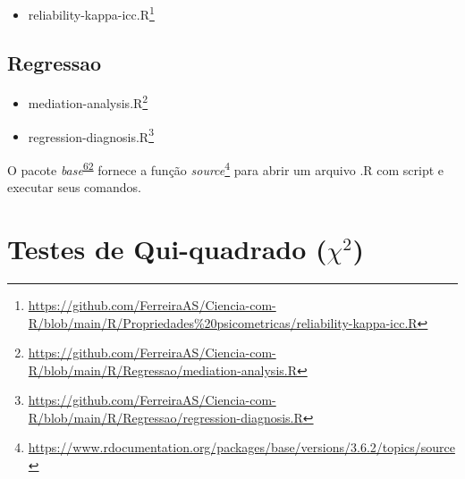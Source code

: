 \documentclass[
  a4paper,
]{book}
\providecommand{\tightlist}{%
  \setlength{\itemsep}{0pt}\setlength{\parskip}{0pt}}
\renewcommand{\href}[2]{#2\footnote{\url{#1}}}
\newenvironment{infobox}[1]
  {
  \begin{itemize}
  \renewcommand{\labelitemi}{
    \raisebox{-.7\height}[0pt][0pt]{
      {\setkeys{Gin}{width=3em,keepaspectratio}
        \texttt{[image: \#1]}}
    }
  }
  \setlength{\fboxsep}{1em}
  \begin{blackbox}
  \item
  }
  {
  \end{blackbox}
  \end{itemize}
  }
\begin{document}
\begin{itemize}
\tightlist
\item
  \href{https://github.com/FerreiraAS/Ciencia-com-R/blob/main/R/Propriedades\%20psicometricas/reliability-kappa-icc.R}{reliability-kappa-icc.R}
\end{itemize}

\hypertarget{regressao}{%
\subsection{Regressao}\label{regressao}}

\begin{itemize}
\item
  \href{https://github.com/FerreiraAS/Ciencia-com-R/blob/main/R/Regressao/mediation-analysis.R}{mediation-analysis.R}
\item
  \href{https://github.com/FerreiraAS/Ciencia-com-R/blob/main/R/Regressao/regression-diagnosis.R}{regression-diagnosis.R}
\end{itemize}

\begin{infobox}{images/Rlogo}
O pacote \emph{base}\textsuperscript{\protect\hyperlink{ref-base-2}{62}} fornece a função \href{https://www.rdocumentation.org/packages/base/versions/3.6.2/topics/source}{\emph{source}} para abrir um arquivo .R com script e executar seus comandos.

\end{infobox}

\hypertarget{testes-de-qui-quadrado-chi2}{%
\section{\texorpdfstring{Testes de Qui-quadrado (\(\chi^2\))}{Testes de Qui-quadrado (\textbackslash chi\^{}2)}}\label{testes-de-qui-quadrado-chi2}}
\end{document}
